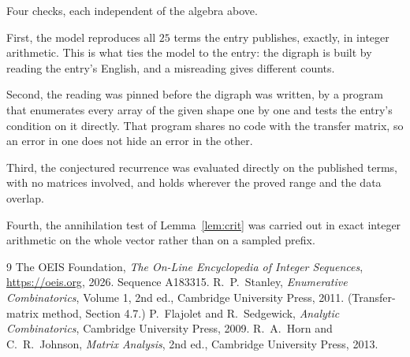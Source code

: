 \documentclass[11pt,a4paper]{article}
\theoremstyle{plain}
\theoremstyle{definition}
\begin{document}
Four checks, each independent of the algebra above.

First, the model reproduces all $25$ terms the entry publishes, exactly, in integer
arithmetic. This is what ties the model to the entry: the digraph is built by reading the
entry's English, and a misreading gives different counts.

Second, the reading was pinned before the digraph was written, by a program that enumerates
every array of the given shape one by one and tests the entry's condition on it directly. That program shares no code with the transfer matrix, so an error in one does not
hide an error in the other.

Third, the conjectured recurrence was evaluated directly on the published terms, with no
matrices involved, and holds wherever the proved range and the data overlap.

Fourth, the annihilation test of Lemma~\ref{lem:crit} was carried out in exact integer
arithmetic on the whole vector rather than on a sampled prefix.

\begin{thebibliography}{9}
 The OEIS Foundation, \emph{The On-Line Encyclopedia of Integer
Sequences}, \url{https://oeis.org}, 2026. Sequence A183315.
 R.~P.~Stanley, \emph{Enumerative Combinatorics}, Volume 1, 2nd ed.,
Cambridge University Press, 2011. (Transfer-matrix method, Section 4.7.)
 P.~Flajolet and R.~Sedgewick, \emph{Analytic Combinatorics}, Cambridge
University Press, 2009.
 R.~A.~Horn and C.~R.~Johnson, \emph{Matrix Analysis}, 2nd ed., Cambridge
University Press, 2013.
\end{thebibliography}
\end{document}

